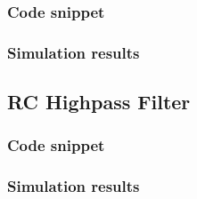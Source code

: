\documentclass[12pt]{article}
\begin{document}
\subsubsection{Code snippet}

\subsubsection{Simulation results}

\subsection{RC Highpass Filter}
\subsubsection{Code snippet}

\subsubsection{Simulation results}
\end{document}
